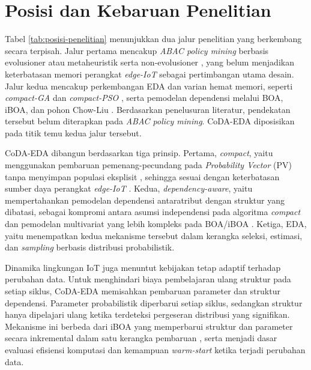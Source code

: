 \section{Posisi dan Kebaruan Penelitian}

Tabel \ref{tab:posisi-penelitian} menunjukkan dua jalur penelitian yang berkembang secara terpisah. 
Jalur pertama mencakup \textit{ABAC policy mining} berbasis evolusioner atau metaheuristik \parencite{gaspar-cunha_evolutionary_2015,shang_abac_2024,li_attribute_2026} serta non-evolusioner \parencite{guo_--fly_2025}, yang belum menjadikan keterbatasan memori perangkat \textit{edge-IoT} sebagai pertimbangan utama desain. 
Jalur kedua mencakup perkembangan EDA dan varian hemat memori, seperti \textit{compact-GA} dan \textit{compact-PSO} \parencite{khalfi_metaheuristics_2023}, serta pemodelan dependensi melalui BOA, iBOA, dan pohon Chow-Liu \parencite{pelikan_iboa_2008,chow_approximating_1968}. 
Berdasarkan penelusuran literatur, pendekatan tersebut belum diterapkan pada \textit{ABAC policy mining}. 
CoDA-EDA diposisikan pada titik temu kedua jalur tersebut.

CoDA-EDA dibangun berdasarkan tiga prinsip. 
Pertama, \textit{compact}, yaitu menggunakan pembaruan pemenang-pecundang pada \textit{Probability Vector} (PV) tanpa menyimpan populasi eksplisit \parencite{khalfi_metaheuristics_2023}, sehingga sesuai dengan keterbatasan sumber daya perangkat \textit{edge-IoT} \parencite{canavese_security_2024}. 
Kedua, \textit{dependency-aware}, yaitu mempertahankan pemodelan dependensi antaratribut dengan struktur yang dibatasi, sebagai kompromi antara asumsi independensi pada algoritma \textit{compact} dan pemodelan multivariat yang lebih kompleks pada BOA/iBOA \parencite{pelikan_iboa_2008}. 
Ketiga, EDA, yaitu menempatkan kedua mekanisme tersebut dalam kerangka seleksi, estimasi, dan \textit{sampling} berbasis distribusi probabilistik.

Dinamika lingkungan IoT \parencite{ragothaman_access_2023} juga menuntut kebijakan tetap adaptif terhadap perubahan data. 
Untuk menghindari biaya pembelajaran ulang struktur pada setiap siklus, CoDA-EDA memisahkan pembaruan parameter dan struktur dependensi. 
Parameter probabilistik diperbarui setiap siklus, sedangkan struktur hanya dipelajari ulang ketika terdeteksi pergeseran distribusi yang signifikan. 
Mekanisme ini berbeda dari iBOA yang memperbarui struktur dan parameter secara inkremental dalam satu kerangka pembaruan \parencite{pelikan_iboa_2008}, serta menjadi dasar evaluasi efisiensi komputasi dan kemampuan \textit{warm-start} ketika terjadi perubahan data.

